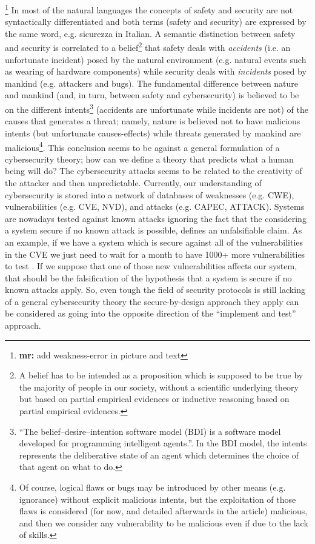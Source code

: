 \documentclass[conference]{IEEEtran}
\newcommand{\fixnote}[2]{\textbf{\color{red}{FIX}}\footnote{{\bf #1:} #2}}
\begin{document}
\fixnote{mr}{add weakness-error in picture and text}
In most of the natural languages the concepts of safety
and security are not syntactically differentiated and both terms (safety and
security) are expressed by the same word, e.g. sicurezza in Italian.  A
semantic distinction between safety and security is correlated to a
belief\footnote{A belief has to be intended as a proposition which is supposed
to be true by the majority of people in our society, without a scientific
underlying theory but based on partial empirical evidences or inductive reasoning based on partial empirical evidences.} that
safety deals with \emph{accidents} (i.e. an unfortunate incident) posed by the
natural environment (e.g. natural events such as wearing of hardware
components) while security deals with \emph{incidents} posed by mankind (e.g.
attackers and bugs).  The fundamental difference between nature and mankind (and,
in turn, between safety and cybersecurity) is believed to be on the different
intents\footnote{``The belief–desire–intention software model (BDI) is a
software model developed for programming intelligent
agents.''\cite{wiki-bdi}. In the BDI model, the intents represents the
deliberative state of an agent which determines the choice of that agent on
what to do.} (accidents are unfortunate while incidents are not) of the causes
that generates a threat; namely, nature is believed not to have malicious
intents (but unfortunate causes-effects) while threats generated by mankind are
malicious\footnote{Of course, logical flaws or bugs may be
introduced by other means (e.g. ignorance) without explicit malicious intents,
but the exploitation of those flaws is considered (for now, and detailed
afterwards in the article) malicious, and then we consider any vulnerability to
be malicious even if due to the lack of skills.}.
This conclusion seems to be against a general formulation of a cybersecurity theory;
how can we define a theory that predicts what a human being will do?
The cybersecurity attacks seems to be related to the creativity of the attacker
and then unpredictable. Currently, our understanding of cybersecurity is
stored into a network of databases of weaknesses (e.g.
CWE\cite{MITRE2020CWEresearch}), vulnerabilities (e.g. CVE\cite{CVE},
NVD\cite{NIST2020NVD}),
and attacks (e.g. CAPEC\cite{MITRE2020CAPEC}, ATTACK\cite{attack}). Systems are
nowadays tested against 
known attacks ignoring the fact that the considering a system secure
if no known attack is possible, defines an unfalsifiable claim.
As an example, if we have a system which is secure against all of the
vulnerabilities in the CVE we just need to wait for a month to have 1000+ more
vulnerabilities to test \cite{newVulns}. If we suppose that one of those new vulnerabilities
affects our system, that should be the falsification of the hypothesis that a
system is secure if no known attacks apply. So, even tough the field 
of security protocols is still lacking of a general cybersecurity theory
the secure-by-design approach they apply can be considered as going
into the opposite direction of the ``implement and test'' approach.
\end{document}

